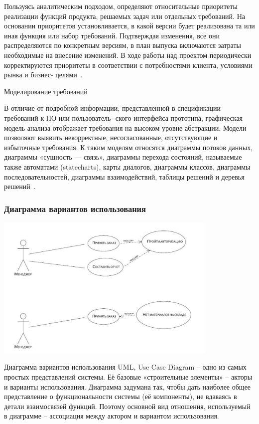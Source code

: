 \documentclass{../industrial-development}
\begin{document}
Пользуясь аналитическим подходом, определяют относительные приоритеты реализации функций продукта, решаемых задач или отдельных требований.
На основании приоритетов установливается, в какой версии будет реализована та или иная функция или набор требований. Подтверждая изменения, все они распределяются по конкретным версиям, в план выпуска включаются затраты необходимые на внесение изменений.
В ходе работы над проектом периодически корректируются приоритеты в соответствии с потребностями клиента, условиями рынка и бизнес-
целями~\cite[с.~48-49]{Wiegers}.

\alert{Моделирование требований}

В отличие от подробной информации, представленной в спецификации требований к ПО или пользователь-
ского интерфейса прототипа, графическая модель анализа отображает требования на высоком уровне абстракции. Модели позволяют выявить некорректные, несогласованные, отсутствующие и избыточные
требования. К таким моделям относятся диаграммы потоков данных, диаграммы «сущность — связь», диаграммы перехода состояний, называемые также автоматами (statecharts), карты диалогов, диаграммы
классов, диаграммы последовательностей, диаграммы взаимодействий, таблицы решений и деревья решений~\cite[с.~49]{Wiegers}.

\begin{frame} \frametitle {Диаграмма вариантов использования}
 \centerline{\includegraphics[width=0.8\textwidth]{pict4.pdf}}
\end{frame}

\lecturenotes

\alert{Диаграмма вариантов использования UML, Use Case Diagram} – одно из самых простых представлений системы. Её базовые «строительные элементы» – акторы и варианты использования. Диаграмма задумана так, чтобы дать наиболее общее
представление о функциональности системы (её компоненты), не вдаваясь в детали
взаимосвязей функций. Поэтому основной вид отношения, используемый в диаграмме –
ассоциация между актором и вариантом использования.
\end{document}
